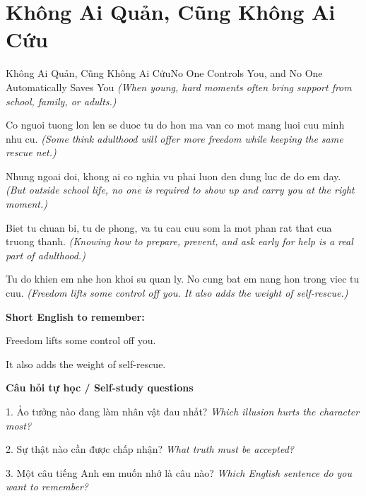 \section{Không Ai Quản, Cũng Không Ai Cứu}
\begin{truyen}{Không Ai Quản, Cũng Không Ai Cứu}{No One Controls You, and No One Automatically Saves You}
\textit{(When young, hard moments often bring support from school, family, or adults.)}

Co nguoi tuong lon len se duoc tu do hon ma van co mot mang luoi cuu minh nhu cu.
\textit{(Some think adulthood will offer more freedom while keeping the same rescue net.)}

Nhung ngoai doi, khong ai co nghia vu phai luon den dung luc de do em day.
\textit{(But outside school life, no one is required to show up and carry you at the right moment.)}

Biet tu chuan bi, tu de phong, va tu cau cuu som la mot phan rat that cua truong thanh.
\textit{(Knowing how to prepare, prevent, and ask early for help is a real part of adulthood.)}

\end{truyen}

\begin{baihoc}
Tu do khien em nhe hon khoi su quan ly. No cung bat em nang hon trong viec tu cuu.
\textit{(Freedom lifts some control off you. It also adds the weight of self-rescue.)}
\end{baihoc}

\begin{ghinhoanh}
\textbf{Short English to remember:}

Freedom lifts some control off you.

It also adds the weight of self-rescue.

\end{ghinhoanh}

\begin{tuhocnhanh}
\textbf{Câu hỏi tự học / Self-study questions}

1. Ảo tưởng nào đang làm nhân vật đau nhất? \textit{Which illusion hurts the character most?}

2. Sự thật nào cần được chấp nhận? \textit{What truth must be accepted?}

3. Một câu tiếng Anh em muốn nhớ là câu nào? \textit{Which English sentence do you want to remember?}
\end{tuhocnhanh}
\ngancach

